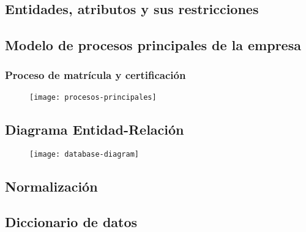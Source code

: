 \documentclass[../main.tex]{subfiles}
\begin{document}
\subsection{Entidades, atributos y sus restricciones}



\subsection{Modelo de procesos principales de la empresa}

\subsubsection{Proceso de matrícula y certificación}

\begin{figure}[H]
  \centering
  \texttt{[image: procesos-principales]}
\end{figure}

\subsection{Diagrama Entidad-Relación}

\begin{figure}[H]
  \centering
  \texttt{[image: database-diagram]}
\end{figure}

\subsection{Normalización}



\subsection{Diccionario de datos}


\end{document}
